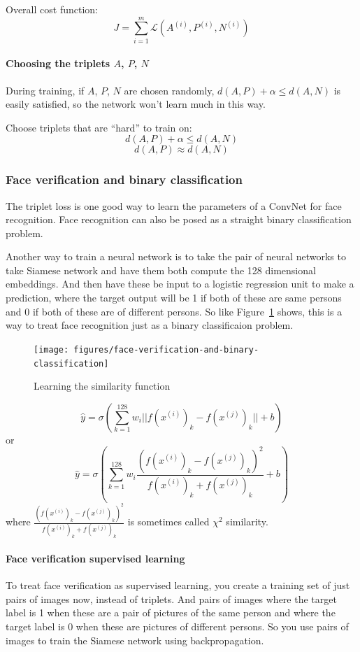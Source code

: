 \documentclass[UTF8]{article}
\newcommand{\Cal}[1]{\mathcal{#1}}                  %
\begin{document}
Overall cost function:
$$ J = \sum_{i=1}^m \Cal{L}(A^{(i)}, P^{(i)}, N^{(i)}) $$

\paragraph{Choosing the triplets $A$, $P$, $N$}
During training, if $A$, $P$, $N$ are chosen randomly, $d(A, P) + \alpha \leq d(A, N)$ is easily
satisfied, so the network won't learn much in this way.

Choose triplets that are ``hard'' to train on:
$$ d(A, P) + \alpha \leq d(A, N) $$
$$ d(A, P) \approx d(A, N) $$

\subsubsection{Face verification and binary classification}
The triplet loss is one good way to learn the parameters of a ConvNet for face recognition. Face
recognition can also be posed as a straight binary classification problem.

Another way to train a neural network is to take the pair of neural networks to take Siamese
network and have them both compute the 128 dimensional embeddings. And then have these be input to
a logistic regression unit to make a prediction, where the target output will be 1 if both of these
are same persons and 0 if both of these are of different persons. So like
Figure~\ref{fig:face-verification-and-binary-classification} shows, this is a way to treat face
recognition just as a binary classificaion problem.

\begin{figure}[htb]
    \centering
    \texttt{[image: figures/face-verification-and-binary-classification]}
    \caption{Learning the similarity function}
    \label{fig:face-verification-and-binary-classification}
\end{figure}

$$ \hat{y} = \sigma(\sum_{k=1}^{128} w_i ||f(x^{(i)})_k - f(x^{(j)})_k|| + b) $$
or
$$ \hat{y} = \sigma(\sum_{k=1}^{128} w_i \frac{(f(x^{(i)})_k - f(x^{(j)})_k)^2}{f(x^{(i)})_k
+ f(x^{(j)})_k} + b) $$
where $\displaystyle \frac{(f(x^{(i)})_k - f(x^{(j)})_k)^2}{f(x^{(i)})_k + f(x^{(j)})_k}$ is
sometimes called $\chi^2$ similarity.

\paragraph{Face verification supervised learning}
To treat face verification as supervised learning, you create a training set of just pairs of
images now, instead of triplets. And pairs of images where the target label is 1 when these are
a pair of pictures of the same person and where the target label is 0 when these are pictures of
different persons. So you use pairs of images to train the Siamese network using backpropagation.
\end{document}
